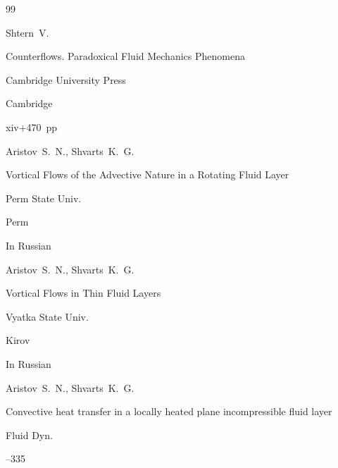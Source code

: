 \begin{thebibliography}{99}




\by Shtern~V. 

\book Counterflows. Paradoxical Fluid Mechanics Phenomena


\publ Cambridge University Press

\publaddr Cambridge

\totalpages xiv+470~pp \nofrills





\by Aristov~S.~N., Shvarts~K.~G. 

\book Vortical Flows of the Advective Nature in a Rotating Fluid Layer


\publ Perm State Univ.

\publaddr Perm


\lang In Russian




\by Aristov~S.~N., Shvarts~K.~G. 

\book Vortical Flows in Thin Fluid Layers


\publ Vyatka State Univ. 

\publaddr Kirov


\lang In Russian




\by Aristov~S.~N., Shvarts~K.~G.

\paper Convective heat transfer in a locally heated plane incompressible fluid layer

\jour Fluid Dyn.




--335







\end{thebibliography}
